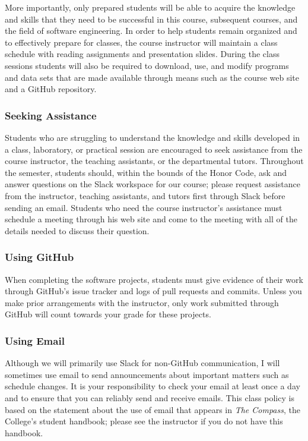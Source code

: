\documentclass[11pt]{article}
\newcommand{\instructorpronoun}[1]{his}
\begin{document}
More importantly, only prepared students will be able to acquire the knowledge
and skills that they need to be successful in this course, subsequent courses,
and the field of software engineering. In order to help students remain
organized and to effectively prepare for classes, the course instructor will
maintain a class schedule with reading assignments and presentation slides.
During the class sessions students will also be required to download, use, and
modify programs and data sets that are made available through means such as the
course web site and a GitHub repository.

\subsubsection*{Seeking Assistance}

Students who are struggling to understand the knowledge and skills developed in
a class, laboratory, or practical session are encouraged to seek assistance from
the course instructor, the teaching assistants, or the departmental tutors.
Throughout the semester, students should, within the bounds of the Honor Code,
ask and answer questions on the Slack workspace for our course; please request
assistance from the instructor, teaching assistants, and tutors first through
Slack before sending an email. Students who need the course instructor's
assistance must schedule a meeting through \instructorpronoun{} web site and
come to the meeting with all of the details needed to discuss their question.

\subsubsection*{Using GitHub}

When completing the software projects, students must give evidence of their work
through GitHub's issue tracker and logs of pull requests and commits. Unless you
make prior arrangements with the instructor, only work submitted through GitHub
will count towards your grade for these projects.

\subsubsection*{Using Email}

Although we will primarily use Slack for non-GitHub communication, I will
sometimes use email to send announcements about important matters such as
schedule changes. It is your responsibility to check your email at least once a
day and to ensure that you can reliably send and receive emails. This class
policy is based on the statement about the use of email that appears in {\em The
Compass}, the College's student handbook; please see the instructor if you do
not have this handbook.
\end{document}
